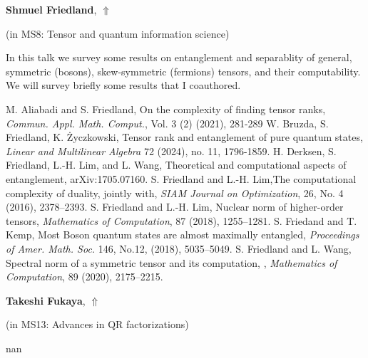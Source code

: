 \documentclass[ILAS2025-program.tex]{subfiles}
\begin{document}
\hypertarget{down0021}{}\begin{ilasabstract}
    
\textbf{Shmuel Friedland},  \hfill \hyperlink{up0021}{$\Uparrow$}
    
    
(in {\color{mstitle}MS8: Tensor and quantum information science})
        
\mtskip
    \begin{bibunit}
        In this talk we survey some results on entanglement and separablity of general, symmetric (bosons),  skew-symmetric (fermions) tensors, and their computability.  We will survey briefly some results that I coauthored.
\begin{thebibliography}{99}
 M. Aliabadi and S. Friedland, On the complexity of finding tensor ranks, \emph{Commun. Appl. Math. Comput.}, Vol. 3 (2) (2021),  281-289
 W. Bruzda, S. Friedland, K. {\.Z}yczkowski, Tensor rank and entanglement of pure quantum states,  {\it Linear and Multilinear Algebra} 72 (2024), no. 11, 1796-1859. 
  H. Derksen,  S. Friedland, L.-H. Lim, and L. Wang, Theoretical and computational aspects of entanglement,  arXiv:1705.07160.
 S. Friedland and  L.-H. Lim,The computational complexity of duality, jointly with,  \emph{SIAM Journal on Optimization}, 26, No. 4 (2016), 2378--2393.
 S. Friedland and  L.-H. Lim, Nuclear norm of higher-order tensors,  \emph{Mathematics of Computation}, 87 (2018), 1255--1281.
 S. Friedand and T. Kemp, Most Boson quantum states are almost maximally entangled,  \emph{Proceedings of Amer. Math. Soc.} 146, No.12, (2018), 5035--5049.
 S. Friedland and L. Wang, Spectral norm of a symmetric tensor and its computation, ,  \emph{Mathematics of Computation}, 89 (2020), 2175--2215.
\end{thebibliography}
        \end{bibunit}
        
\end{ilasabstract}
    

\hypertarget{down0340}{}\begin{ilasabstract}
    
\textbf{Takeshi Fukaya},  \hfill \hyperlink{up0340}{$\Uparrow$}
    
    
(in {\color{mstitle}MS13: Advances in QR factorizations})
        
\mtskip
    nan
\end{ilasabstract}
    
\end{document}
